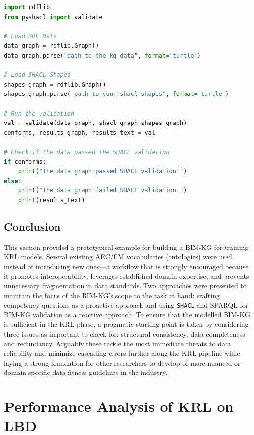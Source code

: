 \begin{lstlisting}[language=python, caption={Python script for loading \ac{RDF} data and \ac{SHACL} shapes for validating a knowledge graph}, label=lst:rdf-and-shapes-loading]
import rdflib
from pyshacl import validate

# Load RDF Data
data_graph = rdflib.Graph()
data_graph.parse("path_to_the_kg_data", format='turtle')

# Load SHACL Shapes
shapes_graph = rdflib.Graph()
shapes_graph.parse("path_to_your_shacl_shapes", format='turtle')

# Run the validation
val = validate(data_graph, shacl_graph=shapes_graph)
conforms, results_graph, results_text = val

# Check if the data passed the SHACL validation
if conforms:
    print("The data graph passed SHACL validation!")
else:
    print("The data graph failed SHACL validation.")
    print(results_text)

\end{lstlisting}

\subsection{Conclusion}
This section provided a prototypical example for building a \ac{BIM-KG} for training \ac{KRL} models. Several existing \ac{AEC/FM} vocabularies (ontologies) were used instead of introducing new ones—a workflow that is strongly encouraged because it promotes interoperability, leverages established domain expertise, and prevents unnecessary fragmentation in data standards. Two approaches were presented to maintain the focus of the \ac{BIM-KG}'s scope to the task at hand: crafting competency questions as a proactive approach and using \texttt{SHACL} and \ac{SPARQL} for \ac{BIM-KG} validation as a reactive approach. To ensure that the modelled \ac{BIM-KG} is sufficient in the \ac{KRL} phase, a pragmatic starting point is taken by considering three issues as important to check for: structural consistency, data completeness and redundancy. Arguably these tackle the most immediate threats to data reliability and minimize cascading errors further along the KRL pipeline while laying a strong foundation for other researchers to develop of more nuanced or domain-specific data-fitness guidelines in the industry.

\section{Performance Analysis of \acf{KRL} on \acf{LBD}}\label{sec: relational-learning}


